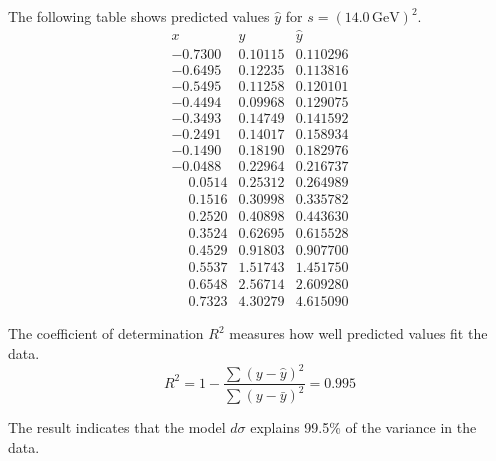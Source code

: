 The following table shows predicted values $\hat y$ for $s=(14.0\,\text{GeV})^2$.
\begin{equation*}
\begin{matrix}
x & y & \hat y\\
-0.7300 & 0.10115 & 0.110296\\
-0.6495 & 0.12235 & 0.113816\\
-0.5495 & 0.11258 & 0.120101\\
-0.4494 & 0.09968 & 0.129075\\
-0.3493 & 0.14749 & 0.141592\\
-0.2491 & 0.14017 & 0.158934\\
-0.1490 & 0.18190 & 0.182976\\
-0.0488 & 0.22964 & 0.216737\\
\phantom{+}0.0514 & 0.25312 & 0.264989\\
\phantom{+}0.1516 & 0.30998 & 0.335782\\
\phantom{+}0.2520 & 0.40898 & 0.443630\\
\phantom{+}0.3524 & 0.62695 & 0.615528\\
\phantom{+}0.4529 & 0.91803 & 0.907700\\
\phantom{+}0.5537 & 1.51743 & 1.451750\\
\phantom{+}0.6548 & 2.56714 & 2.609280\\
\phantom{+}0.7323 & 4.30279 & 4.615090
\end{matrix}
\end{equation*}

The coefficient of determination $R^2$ measures how well predicted values fit the data.
\begin{equation*}
R^2=1-\frac{\sum(y-\hat y)^2}{\sum(y-\bar y)^2}=0.995
\end{equation*}

The result indicates that the model $d\sigma$ explains 99.5\% of the variance in the data.


